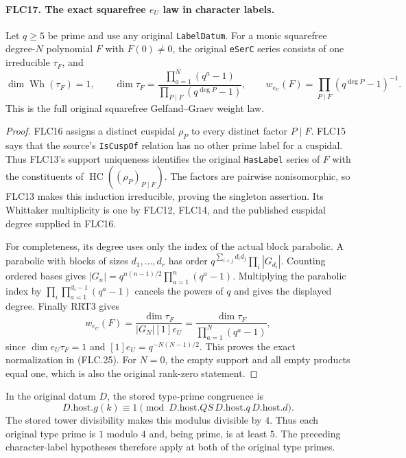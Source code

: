 \paragraph{FLC17. The exact squarefree $e_U$ law in character labels.}
\label{claim:FLC17}
Let $q\ge5$ be prime and use any original \texttt{LabelDatum}.
For a monic squarefree degree-$N$ polynomial $F$ with
$F(0)\ne0$, the original \texttt{eSerC} series consists of
one irreducible $\tau_F$, and
\[
 \dim\operatorname{Wh}(\tau_F)=1,\qquad
 \dim\tau_F=
       \frac{\prod_{a=1}^{N}(q^a-1)}
                         {\prod_{P\mid F}(q^{\deg P}-1)},\qquad
 w_{e_U}(F)=\prod_{P\mid F}(q^{\deg P}-1)^{-1}.
 \tag{FLC.25}
\]
This is the full original squarefree Gelfand--Graev weight law.
\begin{proof}
FLC16 assigns a distinct cuspidal $\rho_P$ to every distinct
factor $P\mid F$.  FLC15 says that the source's
\texttt{IsCuspOf} relation has no other prime label for a
cuspidal.  Thus FLC13's support uniqueness identifies the
original \texttt{HasLabel} series of $F$ with the constituents
of $\operatorname{HC}((\rho_P)_{P\mid F})$.
The factors are pairwise nonisomorphic, so FLC13 makes this
induction irreducible, proving the singleton assertion.
Its Whittaker multiplicity is one by FLC12, FLC14, and the
published cuspidal degree supplied in FLC16.

For completeness, its degree uses only the index of the
actual block parabolic.  A parabolic with blocks of sizes
$d_1,\ldots,d_r$ has order
$q^{\sum_{i<j}d_id_j}\prod_i|G_{d_i}|$.
Counting ordered bases gives
$|G_n|=q^{n(n-1)/2}\prod_{a=1}^n(q^a-1)$.
Multiplying the parabolic index by
$\prod_i\prod_{a=1}^{d_i-1}(q^a-1)$ cancels the powers of
$q$ and gives the displayed degree.  Finally RRT3 gives
\[
 w_{e_U}(F)=\frac{\dim\tau_F}{|G_N|[1]e_U}
          =\frac{\dim\tau_F}{\prod_{a=1}^{N}(q^a-1)},
\]
since $\dim e_U\tau_F=1$ and $[1]e_U=q^{-N(N-1)/2}$.
This proves the exact normalization in (FLC.25).
For $N=0$, the empty support and all empty products equal one,
which is also the original rank-zero statement.
\end{proof}

In the original datum $D$, the stored type-prime congruence is
\[
D.\mathrm{host}.g(k)\equiv1\pmod{D.\mathrm{host}.QS\,
D.\mathrm{host}.q\,D.\mathrm{host}.d}.
\]
The stored tower divisibility makes this modulus divisible by
$4$.  Thus each original type prime is $1$ modulo $4$ and,
being prime, is at least $5$.  The preceding character-label
hypotheses therefore apply at both of the original type primes.

